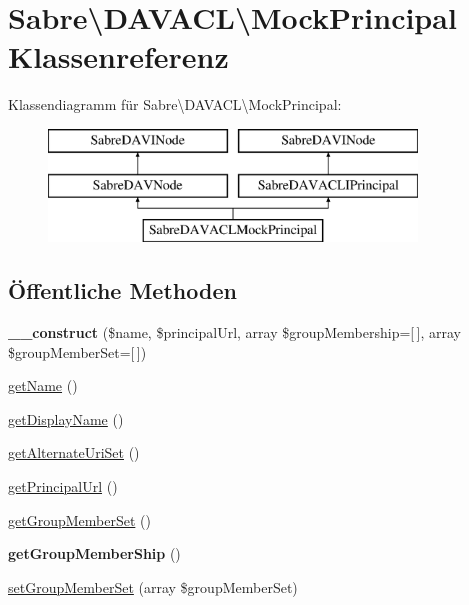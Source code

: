 \hypertarget{class_sabre_1_1_d_a_v_a_c_l_1_1_mock_principal}{}\section{Sabre\textbackslash{}D\+A\+V\+A\+CL\textbackslash{}Mock\+Principal Klassenreferenz}
\label{class_sabre_1_1_d_a_v_a_c_l_1_1_mock_principal}
Klassendiagramm für Sabre\textbackslash{}D\+A\+V\+A\+CL\textbackslash{}Mock\+Principal\+:\begin{figure}[H]
\begin{center}
\leavevmode
\includegraphics[height=3.000000cm]{class_sabre_1_1_d_a_v_a_c_l_1_1_mock_principal}
\end{center}
\end{figure}
\subsection*{Öffentliche Methoden}
\begin{DoxyCompactItemize}
\item 
\mbox{\label{class_sabre_1_1_d_a_v_a_c_l_1_1_mock_principal_a5b825e85dfeafd0690f83a8f7a35c1ae}} 
{\bfseries \+\_\+\+\_\+construct} (\$name, \$principal\+Url, array \$group\+Membership=\mbox{[}$\,$\mbox{]}, array \$group\+Member\+Set=\mbox{[}$\,$\mbox{]})
\item 
\mbox{\hyperlink{class_sabre_1_1_d_a_v_a_c_l_1_1_mock_principal_a844c0331a473eecaf455feefe8989a0f}{get\+Name}} ()
\item 
\mbox{\hyperlink{class_sabre_1_1_d_a_v_a_c_l_1_1_mock_principal_ade06f3efdbb9f386b823cbd861c68416}{get\+Display\+Name}} ()
\item 
\mbox{\hyperlink{class_sabre_1_1_d_a_v_a_c_l_1_1_mock_principal_ac08570a6235b4455752d68a245b654b0}{get\+Alternate\+Uri\+Set}} ()
\item 
\mbox{\hyperlink{class_sabre_1_1_d_a_v_a_c_l_1_1_mock_principal_a41a75dafe4ec09a4570812cf6c8d2c3d}{get\+Principal\+Url}} ()
\item 
\mbox{\hyperlink{class_sabre_1_1_d_a_v_a_c_l_1_1_mock_principal_a1bbf28a5c948869c2f1d94571906b6e4}{get\+Group\+Member\+Set}} ()
\item 
\mbox{\label{class_sabre_1_1_d_a_v_a_c_l_1_1_mock_principal_a7d3bde0a10af0307f6efe4f6497c1002}} 
{\bfseries get\+Group\+Member\+Ship} ()
\item 
\mbox{\hyperlink{class_sabre_1_1_d_a_v_a_c_l_1_1_mock_principal_a2b96db589430a20911aac5fca211adba}{set\+Group\+Member\+Set}} (array \$group\+Member\+Set)
\end{DoxyCompactItemize}
